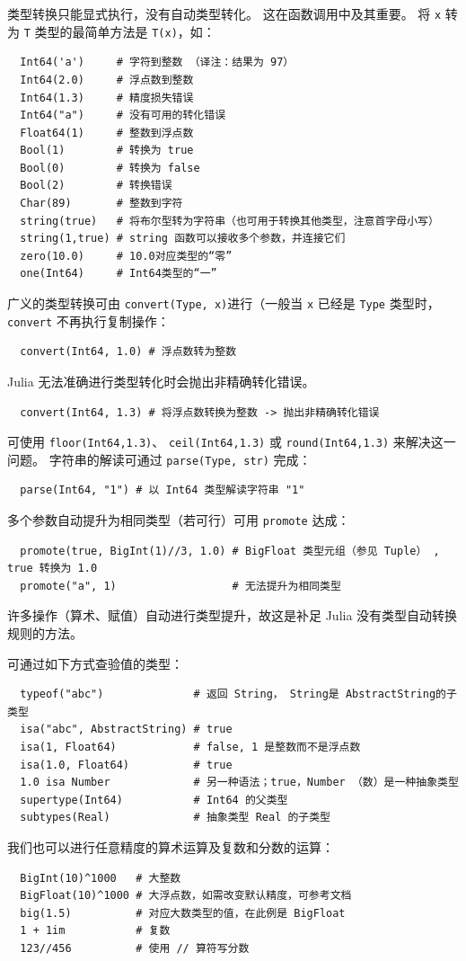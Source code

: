 \documentclass[10pt,a4paper]{article}
\begin{document}
类型转换只能显式执行，没有自动类型转化。
这在函数调用中及其重要。
将 \lstinline|x| 转为 \lstinline|T| 类型的最简单方法是 \lstinline|T(x)|，如：
\begin{lstlisting}
  Int64('a')     # 字符到整数 （译注：结果为 97）
  Int64(2.0)     # 浮点数到整数
  Int64(1.3)     # 精度损失错误
  Int64("a")     # 没有可用的转化错误
  Float64(1)     # 整数到浮点数
  Bool(1)        # 转换为 true
  Bool(0)        # 转换为 false
  Bool(2)        # 转换错误
  Char(89)       # 整数到字符
  string(true)   # 将布尔型转为字符串（也可用于转换其他类型，注意首字母小写）
  string(1,true) # string 函数可以接收多个参数，并连接它们
  zero(10.0)     # 10.0对应类型的“零”
  one(Int64)     # Int64类型的“一”
\end{lstlisting}
广义的类型转换可由 \lstinline|convert(Type, x)|进行（一般当  \lstinline|x| 已经是 \lstinline|Type| 类型时， \lstinline|convert| 不再执行复制操作：
\begin{lstlisting}
  convert(Int64, 1.0) # 浮点数转为整数
\end{lstlisting}
Julia 无法准确进行类型转化时会抛出非精确转化错误。
\begin{lstlisting}
  convert(Int64, 1.3) # 将浮点数转换为整数 -> 抛出非精确转化错误
\end{lstlisting}
可使用 \lstinline|floor(Int64,1.3)|、 \lstinline|ceil(Int64,1.3)| 或 \lstinline|round(Int64,1.3)| 来解决这一问题。
字符串的解读可通过 \lstinline|parse(Type, str)| 完成：
\begin{lstlisting}
  parse(Int64, "1") # 以 Int64 类型解读字符串 "1"
\end{lstlisting}
多个参数自动提升为相同类型（若可行）可用 \lstinline|promote| 达成：
\begin{lstlisting}
  promote(true, BigInt(1)//3, 1.0) # BigFloat 类型元组（参见 Tuple） , true 转换为 1.0
  promote("a", 1)                  # 无法提升为相同类型
\end{lstlisting}
许多操作（算术、赋值）自动进行类型提升，故这是补足 Julia 没有类型自动转换规则的方法。

可通过如下方式查验值的类型：
\begin{lstlisting}
  typeof("abc")              # 返回 String， String是 AbstractString的子类型
  isa("abc", AbstractString) # true
  isa(1, Float64)            # false, 1 是整数而不是浮点数
  isa(1.0, Float64)          # true
  1.0 isa Number             # 另一种语法；true，Number （数）是一种抽象类型
  supertype(Int64)           # Int64 的父类型
  subtypes(Real)             # 抽象类型 Real 的子类型
\end{lstlisting}
我们也可以进行任意精度的算术运算及复数和分数的运算：
\begin{lstlisting}
  BigInt(10)^1000   # 大整数
  BigFloat(10)^1000 # 大浮点数，如需改变默认精度，可参考文档
  big(1.5)          # 对应大数类型的值，在此例是 BigFloat
  1 + 1im           # 复数
  123//456          # 使用 // 算符写分数
\end{lstlisting}
\end{document}
